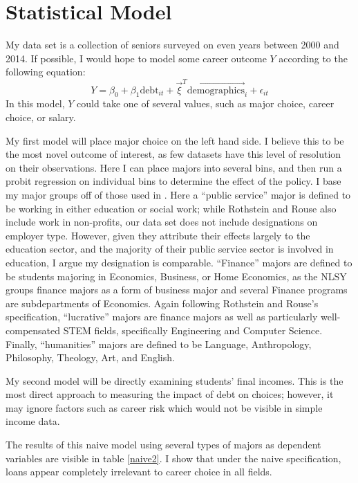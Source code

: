 \documentclass[12pt]{article}
\begin{document}
	\section{Statistical Model}
	
	My data set is a collection of seniors surveyed on even years between 2000 and 2014. If possible, I would hope to model some career outcome $Y$ according to the following equation: 
	\begin{equation}
	Y = \beta_0 + \beta_1 \mbox{debt}_{it} + \vec{\xi}^T \vec{\mbox{demographics}}_i + \epsilon_{it} \label{naiveeq}
	\end{equation} 
	In this model, $Y$ could take one of several values, such as major choice, career choice, or salary. 
	
	My first model will place major choice on the left hand side. I believe this to be the most novel outcome of interest, as few datasets have this level of resolution on their observations. Here I can place majors into several bins, and then run a probit regression on individual bins to determine the effect of the policy. I base my major groups off of those used in \textcite{rothstein2011}. Here a ``public service'' major is defined to be working in either education or social work; while Rothstein and Rouse also include work in non-profits, our data set does not include designations on employer type. However, given they attribute their effects largely to the education sector, and the majority of their public service sector is involved in education, I argue my designation is comparable. ``Finance'' majors are defined to be students majoring in Economics, Business, or Home Economics, as the NLSY groups finance majors as a form of business major and several Finance programs are subdepartments of Economics. Again following Rothstein and Rouse's specification, ``lucrative'' majors are finance majors as well as particularly well-compensated STEM fields, specifically Engineering and Computer Science. Finally, ``humanities'' majors are defined to be Language, Anthropology, Philosophy, Theology, Art, and English.
	
	My second model will be directly examining students' final incomes. This is the most direct approach to measuring the impact of debt on choices; however, it may ignore factors such as career risk which would not be visible in simple income data.
	
	The results of this naive model using several types of majors as dependent variables are visible in table \ref{naive2}. I show that under the naive specification, loans appear completely irrelevant to career choice in all fields.
	
\end{document}
